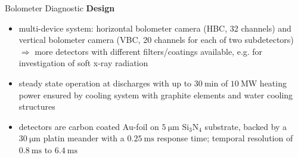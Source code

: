 \documentclass[final]{beamer}
\newcommand{\fett}[1]{\textbf{#1}}
\begin{document}
\begin{frame}
\begin{minipage}[t]{0.39\textwidth}
\begin{kasten}{\large%
            Bolometer Diagnostic}
            \vspace*{.25cm}%
            \large{{\color{ipp}\fett{%
                Design}}}%
            \vspace*{.25cm}\small{%
            \begin{itemize}%
                \item{%
                    multi-device system: horizontal bolometer camera %
                    (HBC, 32 channels) and vertical bolometer camera %
                    (VBC, 20 channels for each of two subdetectors)%
                    \newline$\Rightarrow$ more detectors with different %
                    filters/coatings available, e.g. for investigation %
                    of soft x-ray radiation}%
                \item{%
                    steady state operation at discharges with up to %
                    $\SI{30}{\minute}$ of $\SI{10}{\mega\watt}$ heating %
                    power ensured by cooling system with %
                    graphite elements and water cooling structures}
                \item{%
                    detectors are carbon coated Au-foil %
                    on $\SI{5}{\micro\meter}$ Si$_{3}$N$_{4}$ %
                    substrate, backed by a $\SI{30}{\micro\meter}$ %
                    platin meander with a $\SI{0.25}{\milli\second}$ %
                    response time; temporal resolution of %
                    $\SI{0.8}{\milli\second}$ to $\SI{6.4}{\milli\second}$}%
            \end{itemize}}%
            \vspace*{.25cm}%
            \begin{columns}%
            \end{columns}%
            \vspace*{.25cm}%
            \begin{center}%

\end{center}
\end{kasten}
\end{minipage}
\end{frame}
\end{document}
